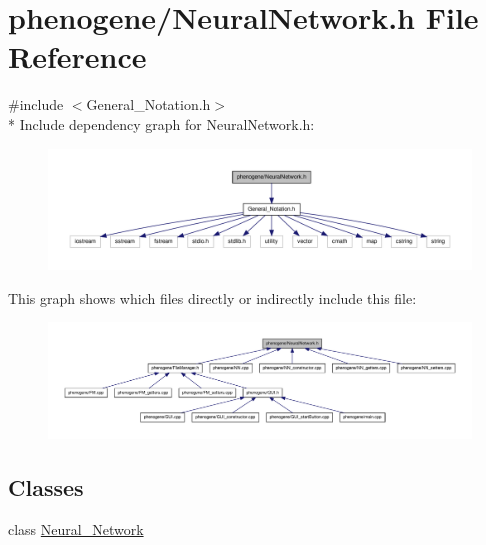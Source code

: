 \hypertarget{a00014}{\section{phenogene/\-Neural\-Network.h File Reference}
\label{d2/de7/a00014}
}
{\ttfamily \#include $<$General\-\_\-\-Notation.\-h$>$}\\*
Include dependency graph for Neural\-Network.\-h\-:\nopagebreak
\begin{figure}[H]
\begin{center}
\leavevmode
\includegraphics[width=350pt]{d4/d8c/a00035}
\end{center}
\end{figure}
This graph shows which files directly or indirectly include this file\-:\nopagebreak
\begin{figure}[H]
\begin{center}
\leavevmode
\includegraphics[width=350pt]{de/d8c/a00036}
\end{center}
\end{figure}
\subsection*{Classes}
\begin{DoxyCompactItemize}
\item 
class \hyperlink{a00003}{Neural\-\_\-\-Network}
\end{DoxyCompactItemize}

